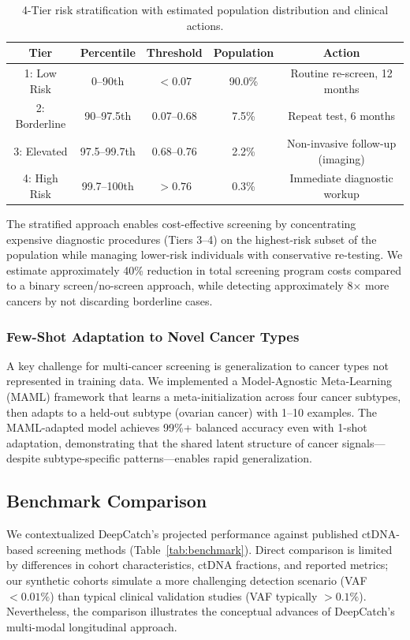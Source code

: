 \documentclass[10pt,a4paper]{article}
\begin{document}
\begin{table}[H]
\centering
\caption{4-Tier risk stratification with estimated population distribution and clinical actions.}
\label{tab:risk_tiers}
\begin{tabular}{c c c c c}
\toprule
\textbf{Tier} & \textbf{Percentile} & \textbf{Threshold} & \textbf{Population} & \textbf{Action} \\
\midrule
1: Low Risk & 0--90th & $<0.07$ & 90.0\% & Routine re-screen, 12 months \\
2: Borderline & 90--97.5th & 0.07--0.68 & 7.5\% & Repeat test, 6 months \\
3: Elevated & 97.5--99.7th & 0.68--0.76 & 2.2\% & Non-invasive follow-up (imaging) \\
4: High Risk & 99.7--100th & $>0.76$ & 0.3\% & Immediate diagnostic workup \\
\bottomrule
\end{tabular}
\end{table}

The stratified approach enables cost-effective screening by concentrating expensive diagnostic procedures (Tiers 3--4) on the highest-risk subset of the population while managing lower-risk individuals with conservative re-testing. We estimate approximately 40\% reduction in total screening program costs compared to a binary screen/no-screen approach, while detecting approximately 8$\times$ more cancers by not discarding borderline cases.

\subsubsection{Few-Shot Adaptation to Novel Cancer Types}

A key challenge for multi-cancer screening is generalization to cancer types not represented in training data. We implemented a Model-Agnostic Meta-Learning (MAML) framework that learns a meta-initialization across four cancer subtypes, then adapts to a held-out subtype (ovarian cancer) with 1--10 examples. The MAML-adapted model achieves 99\%+ balanced accuracy even with 1-shot adaptation, demonstrating that the shared latent structure of cancer signals—despite subtype-specific patterns—enables rapid generalization.

\subsection{Benchmark Comparison}

We contextualized DeepCatch's projected performance against published ctDNA-based screening methods (Table~\ref{tab:benchmark}). Direct comparison is limited by differences in cohort characteristics, ctDNA fractions, and reported metrics; our synthetic cohorts simulate a more challenging detection scenario (VAF $< 0.01\%$) than typical clinical validation studies (VAF typically $> 0.1\%$). Nevertheless, the comparison illustrates the conceptual advances of DeepCatch's multi-modal longitudinal approach.
\end{document}

